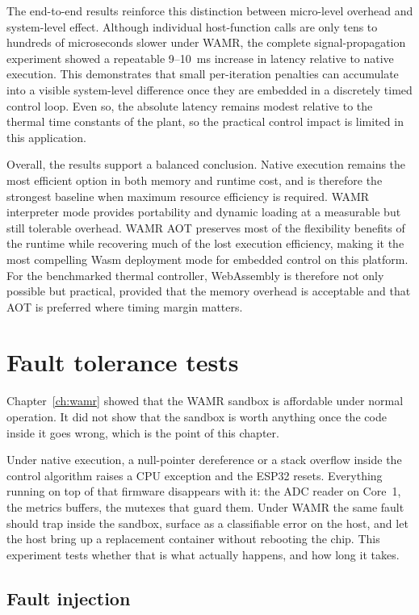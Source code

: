 \documentclass[12pt, a4paper]{report}
\begin{document}
The end-to-end results reinforce this distinction between micro-level overhead and system-level effect. Although individual host-function calls are only tens to hundreds of microseconds slower under WAMR, the complete signal-propagation experiment showed a repeatable 9--10~ms increase in latency relative to native execution. This demonstrates that small per-iteration penalties can accumulate into a visible system-level difference once they are embedded in a discretely timed control loop. Even so, the absolute latency remains modest relative to the thermal time constants of the plant, so the practical control impact is limited in this application.

Overall, the results support a balanced conclusion. Native execution remains the most efficient option in both memory and runtime cost, and is therefore the strongest baseline when maximum resource efficiency is required. WAMR interpreter mode provides portability and dynamic loading at a measurable but still tolerable overhead. WAMR AOT preserves most of the flexibility benefits of the runtime while recovering much of the lost execution efficiency, making it the most compelling Wasm deployment mode for embedded control on this platform. For the benchmarked thermal controller, WebAssembly is therefore not only possible but practical, provided that the memory overhead is acceptable and that AOT is preferred where timing margin matters.

\chapter{Fault tolerance tests}
\label{ch:fault_tolerance}

Chapter~\ref{ch:wamr} showed that the WAMR sandbox is affordable under normal operation. It did not show that the sandbox is worth anything once the code inside it goes wrong, which is the point of this chapter.

Under native execution, a null-pointer dereference or a stack overflow inside the control algorithm raises a CPU exception and the ESP32 resets. Everything running on top of that firmware disappears with it: the ADC reader on Core~1, the metrics buffers, the mutexes that guard them. Under WAMR the same fault should trap inside the sandbox, surface as a classifiable error on the host, and let the host bring up a replacement container without rebooting the chip. This experiment tests whether that is what actually happens, and how long it takes.

\section{Fault injection}
\label{sec:fault-injection}
\end{document}
